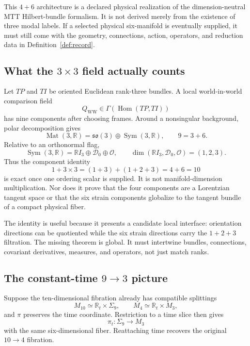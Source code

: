 \documentclass[11pt]{article}
\theoremstyle{definition}
\theoremstyle{remark}
\newcommand{\cD}{\mathcal D}
\newcommand{\cO}{\mathcal O}
\begin{document}
This \(4+6\) architecture is a declared physical realization of the
dimension-neutral MTT Hilbert-bundle formalism.  It is not derived merely
from the existence of three modal labels.  If a selected physical
six-manifold is eventually supplied, it must still come with the geometry,
connections, action, operators, and reduction data in
Definition~\ref{def:record}.

\subsection{What the \(3\times3\) field actually counts}

Let \(TP\) and \(TI\) be oriented Euclidean rank-three bundles.  A local
world-in-world comparison field
\[
 Q_{\mathrm{WW}}\in\Gamma(\operatorname{Hom}(TP,TI))
\]
has nine components after choosing frames.  Around a nonsingular background,
polar decomposition gives
\[
 \operatorname{Mat}(3,\mathbb R)
 =
 \mathfrak{so}(3)\oplus\operatorname{Sym}(3,\mathbb R),
 \qquad 9=3+6.
\]
Relative to an orthonormal flag,
\[
 \operatorname{Sym}(3,\mathbb R)
 =
 \mathbb RI_3\oplus\cD_0\oplus\cO,
 \qquad \dim(\mathbb RI_3,\cD_0,\cO)=(1,2,3).
\]
Thus the component identity
\[
 1+3\times3=(1+3)+(1+2+3)=4+6=10
\]
is exact once one ordering scalar is supplied.  It is not manifold-dimension
multiplication.  Nor does it prove that the four components are a Lorentzian
tangent space or that the six strain components globalize to the tangent
bundle of a compact physical fiber.

The identity is useful because it presents a candidate local interface:
orientation directions can be quotiented while the six strain directions
carry the \(1+2+3\) filtration.  The missing theorem is global.  It must
intertwine bundles, connections, covariant derivatives, measures, and
operators, not just match ranks.

\subsection{The constant-time \(9\to3\) picture}

Suppose the ten-dimensional fibration already has compatible splittings
\[
 M_{10}\simeq\mathbb R_t\times\Sigma_9,
 \qquad
 M_4\simeq\mathbb R_t\times M_3,
\]
and \(\pi\) preserves the time coordinate.  Restriction to a time slice then
gives
\[
 \pi_t:\Sigma_9\longrightarrow M_3
\]
with the same six-dimensional fiber.  Reattaching time recovers the original
\(10\to4\) fibration.
\end{document}
